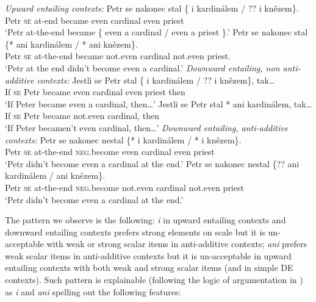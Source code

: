 \documentclass[output=paper,
]{langscibook}
\begin{document}
\ea\label{ex-44} \ea \textit{Upward entailing contexts:}
\ea \gll Petr se nakonec stal \{\hspace{-2pt} i kardinálem / ??\hspace{-2pt} i knězem\}.\\
Petr \textsc{se} at-end became {} even cardinal {} {} even priest\\
\glt `Petr at-the-end became \{ even a cardinal / even a priest \}.'
\ex \gll Petr se nakonec stal \{*\hspace{-2pt} ani kardinálem / *\hspace{-2pt} ani knězem\}.\\
Petr \textsc{se} at-the-end became  {} not.even  cardinal {} {} not.even priest.\\
\glt `Petr at the end didn't become even a cardinal.'
\z
\ex \textit{Downward entailing, non anti-additive contexts:}
\ea \gll Jestli se Petr stal \{\hspace{-2pt} i kardinálem / ??\hspace{-2pt} i knězem\}, tak\ldots\\
If \textsc{se} Petr became {} even cardinal {} {} even priest then\\
\glt `If Peter became even a cardinal, then\ldots'
\ex\gll  Jestli se Petr stal *\hspace{-2pt} ani kardinálem, tak\ldots\\
If \textsc{se} Petr became {} not.even cardinal, then\\
\glt `If Peter becamen't even cardinal, then\ldots'
\z
\ex  \textit{Downward entailing, anti-additive contexts:}
\ea  \gll Petr se nakonec nestal \{*\hspace{-2pt} i kardinálem / *\hspace{-2pt} i knězem\}.\\
Petr \textsc{se} at-the-end \textsc{neg}.become  {} even cardinal {} {} even priest\\
\glt `Petr didn't become even a cardinal at the end.'
\ex  \gll Petr se nakonec nestal \{??\hspace{-2pt} ani kardinálem /\hspace{1.2cm} \hspace{-2pt} ani knězem\}.\\
Petr \textsc{se} at-the-end \textsc{neg}.become {} not.even cardinal {} {} not.even priest\\
\glt `Petr didn't become even a cardinal at the end.'
\z
\z
\z

\noindent The pattern we observe is the following: \textit{i} in upward entailing contexts and downward entailing contexts prefers strong elements on scale but it is un-acceptable with weak or strong scalar items in anti-additive contexts; \textit{ani} prefers weak scalar items in anti-additive contexts but it is un-acceptable in upward entailing contexts with both weak and strong scalar items (and in simple DE contexts). Such pattern is explainable (following the logic of argumentation in \citealt{crnic2011getting}) as \textit{i} and \textit{ani} spelling out the following features:
\end{document}
